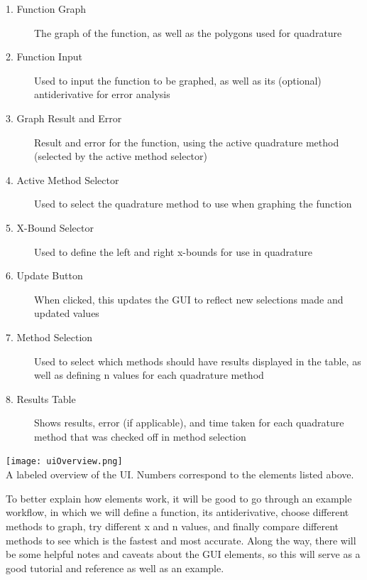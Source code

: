 \documentclass[12pt]{article}
\newcommand{\newLine}{\vspace{5mm}}
\begin{document}
\begin{description}
\item[1. Function Graph] The graph of the function, as well as the polygons used for quadrature
\item[2. Function Input] Used to input the function to be graphed, as well as its (optional) antiderivative for error analysis
\item[3. Graph Result and Error] Result and error for the function, using the active quadrature method (selected by the active method selector)
\item[4. Active Method Selector] Used to select the quadrature method to use when graphing the function
\item[5. X-Bound Selector] Used to define the left and right x-bounds for use in quadrature
\item[6. Update Button] When clicked, this updates the GUI to reflect new selections made and updated values
\item[7. Method Selection] Used to select which methods should have results displayed in the table, as well as defining n values for each quadrature method
\item[8. Results Table] Shows results, error (if applicable), and time taken for each quadrature method that was checked off in method selection
\end{description}

\begin{center}
\texttt{[image: uiOverview.png]} \\
\small A labeled overview of the UI. Numbers correspond to the elements listed above.
\normalsize
\end{center}

\newLine To better explain how elements work, it will be good to go through an example workflow, in which we will define a function, its antiderivative, choose different methods to graph, try different x and n values, and finally compare different methods to see which is the fastest and most accurate. Along the way, there will be some helpful notes and caveats about the GUI elements, so this will serve as a good tutorial and reference as well as an example.
\end{document}
